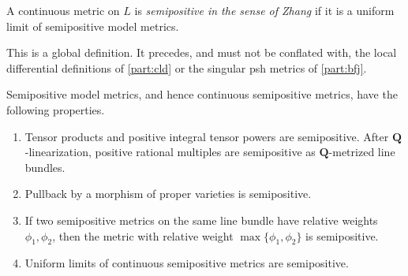 \begin{definition}
\label{def:metrics-continuous-semipositivity}
A continuous metric on $L$ is \emph{semipositive in the sense of Zhang} if
it is a uniform limit of semipositive model metrics.
\end{definition}

This is a global definition. It precedes, and must not be conflated with, the
local differential definitions of \cref{part:cld} or the singular psh metrics
of \cref{part:bfj}.

\begin{proposition}\label{prop:semipositive-stability}
Semipositive model metrics, and hence continuous semipositive metrics, have
the following properties.
\begin{enumerate}
\item Tensor products and positive integral tensor powers are semipositive.
After $\mathbf Q$-linearization, positive rational multiples are
semipositive as $\mathbf Q$-metrized line bundles.
\item Pullback by a morphism of proper varieties is semipositive.
\item If two semipositive metrics on the same line bundle have relative
weights $\phi_1,\phi_2$, then the metric with relative weight
$\max\{\phi_1,\phi_2\}$ is semipositive.
\item Uniform limits of continuous semipositive metrics are semipositive.
\end{enumerate}
\par
\end{proposition}

